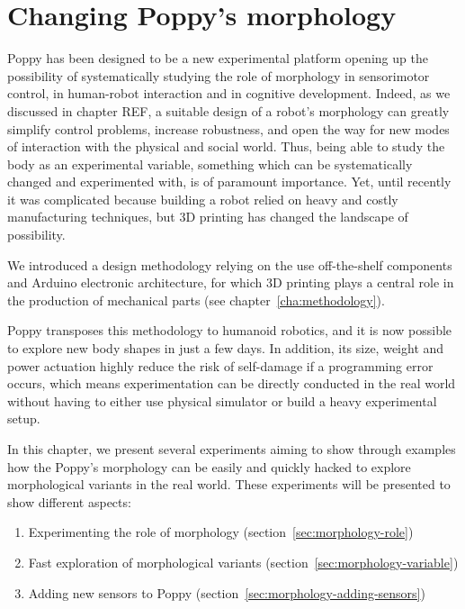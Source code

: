
\cleartoleftpage



\chapter{Changing Poppy's morphology} %
\label{cha:changing_morphology}


Poppy has been designed to be a new experimental platform opening up the possibility of systematically studying the role of morphology in sensorimotor control, in human-robot interaction and in cognitive development. Indeed, as we discussed in chapter REF, a suitable design of a robot’s morphology can greatly simplify control problems, increase robustness, and open the way for new modes of interaction with the physical and social world. Thus, being able to study the body as an experimental variable, something which can be systematically changed and experimented with, is of paramount importance. Yet, until recently it was complicated because building a robot relied on heavy and costly manufacturing techniques, but 3D printing has changed the landscape of possibility.

We introduced a design methodology relying on the use off-the-shelf components and Arduino electronic architecture, for which 3D printing plays a central role in the production of mechanical parts (see chapter~\ref{cha:methodology}).

Poppy transposes this methodology to humanoid robotics, and it is now possible to explore new body shapes in just a few days. In addition, its size, weight and power actuation highly reduce the risk of self-damage if a programming error occurs, which means experimentation can be directly conducted in the real world without having to either use physical simulator or build a heavy experimental setup.

In this chapter, we present several experiments aiming to show through examples how the Poppy's morphology can be easily and quickly hacked  to explore morphological variants in the real world.
These experiments will be presented to show different aspects:

\begin{enumerate}
    \item Experimenting the role of morphology (section~\ref{sec:morphology-role})
    \item Fast exploration of morphological variants (section~\ref{sec:morphology-variable})
    \item Adding new sensors to Poppy (section~\ref{sec:morphology-adding-sensors})
\end{enumerate}



